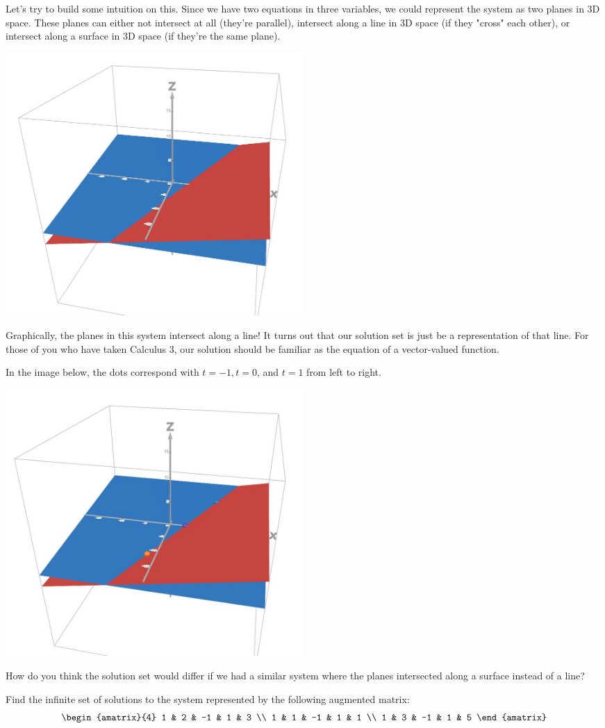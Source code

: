 \documentclass[11pt]{exam}
\begin{document}
        Let's try to build some intuition on this. Since we have two equations in three variables, we could represent the system as two planes in 3D space.
        These planes can either not intersect at all (they're parallel), intersect along a line in 3D space (if they "cross" each other),
        or intersect along a surface in 3D space (if they're the same plane).

        \begin{center}
            \includegraphics[width=0.5\textwidth]{planes.JPG}
        \end{center}

        Graphically, the planes in this system intersect along a line! It turns out that our solution set  is just be a representation of that line.
        For those of you who have taken Calculus 3, our solution should be familiar as the equation of a vector-valued function.

        In the image below, the dots correspond with $t = -1, t = 0$, and $t = 1$ from left to right.

        \begin{center}
            \includegraphics[width=0.5\textwidth]{planes_with_points.JPG}
        \end{center}

        \begin{questions}
            \item How do you think the solution set would differ if we had a similar system where the planes intersected along a surface instead of a line?
            \pagebreak
            \item Find the infinite set of solutions to the system represented by the following augmented matrix:
            $$\begin{amatrix}{4}
                1 & 2 & -1 & 1 & 3 \\
                1 & 1 & -1 & 1 & 1 \\
                1 & 3 & -1 & 1 & 5
            \end{amatrix}$$
        \end{questions}
\end{document}
